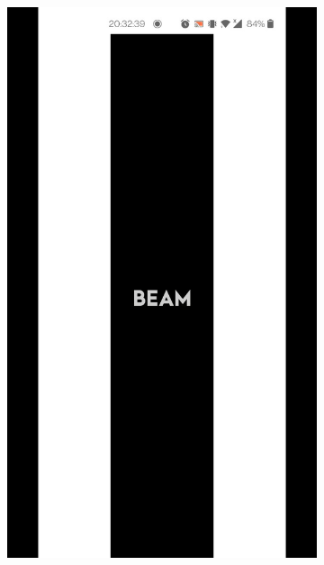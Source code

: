 \documentclass[../report.tex]{subfiles}
\begin{document}
\begin{figure} [H]
	\hspace{0.04\textwidth}
	\begin{subfigure}[b]{0.28\textwidth}
		\centering
		\includegraphics[width=\textwidth]{../images/07/02-app-splash-1.jpg}
		\label{fig:app-splash-2}
	\end{subfigure}
	\hspace{0.04\textwidth}
	\begin{subfigure}[b]{0.28\textwidth}
		\centering

\end{subfigure}
\end{figure}
\end{document}
